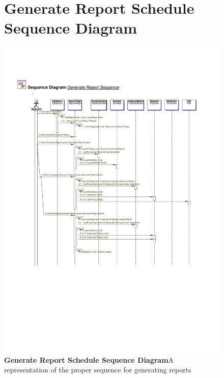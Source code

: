 \documentclass[letterpaper,12pt]{report}
\begin{document}
\begin{figure}[hbp]
 \section{Generate Report Schedule Sequence Diagram}
 \includegraphics[scale=0.65]{externals/SequenceDiagrams6.pdf}
 \caption{\small
\textbf{Generate Report Schedule Sequence Diagram}\newline A representation of the proper sequence for generating reports}\label{fig:seqGenReport}
\end{figure}
\newpage
\end{document}
